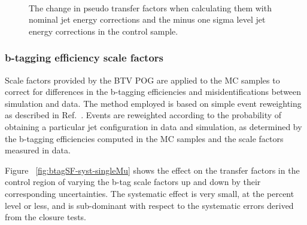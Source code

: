\begin{figure}[]
  \centering
   ~~
  \caption{\label{fig:jes-syst-doubleMu} The change in pseudo transfer
  factors when calculating them with nominal jet energy corrections
  and the minus one sigma level jet energy corrections in the \mmj
  control sample.}
\end{figure}

\subsubsection{b-tagging efficiency scale factors}

Scale factors provided by the BTV POG are applied to the MC samples
to correct for differences in the b-tagging efficiencies and 
misidentifications between simulation and data. The method employed is
based on simple event reweighting as described in
Ref.~\cite{btagSFMethods}. Events are reweighted according to the
probability of obtaining a particular jet configuration in data
and simulation, as determined by the b-tagging efficiencies computed
in the MC samples and the scale factors measured in data.

Figure ~\ref{fig:btagSF-syst-singleMu} shows the effect on the transfer
factors in the \mj control region of varying the b-tag scale factors 
up and down by their corresponding uncertainties. The systematic
effect is very small, at the percent level or less, and is
sub-dominant with respect to the systematic errors derived from the 
closure tests.


